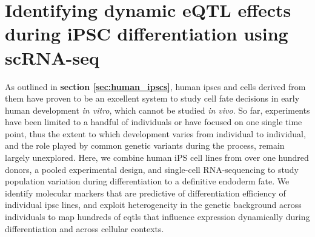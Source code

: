 
\chapter{Identifying dynamic eQTL effects during iPSC differentiation using scRNA-seq}
\label{chapter4}

As outlined in \textbf{section 
\ref{sec:human_ipscs}},
human \glspl{ipsc} and cells derived from them have proven to be an excellent system to study cell fate decisions in early human development \textit{in vitro}, which cannot be studied \textit{in vivo}.
So far, experiments have been limited to a handful of individuals 
or have focused on one single time point,
thus the extent to which development varies from individual to individual, and the role played by common genetic variants during the process, remain largely unexplored.
Here, we combine human iPS cell lines from over one hundred donors, a pooled experimental design, and single-cell RNA-sequencing to study population variation during differentiation to a definitive endoderm fate. 
We identify molecular markers that are predictive of differentiation efficiency of individual \gls{ipsc} lines, and exploit heterogeneity in the genetic background across individuals to map hundreds of \glspl{eqtl} that influence expression dynamically during differentiation and across cellular contexts.\\

\newpage

